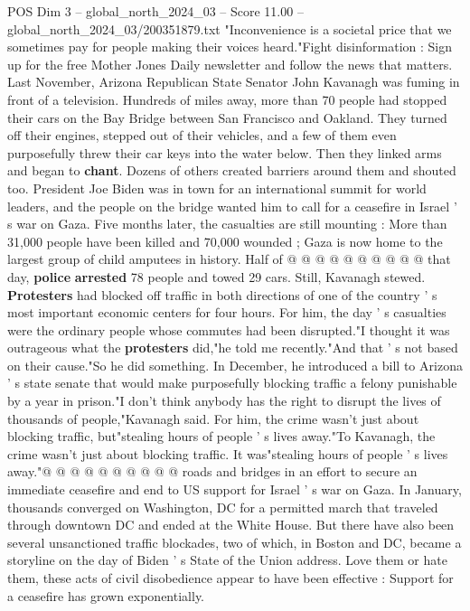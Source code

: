 \begin{textsample}{POS Dim 3 – global\_north\_2024\_03 – Score 11.00 – global\_north\_2024\_03/200351879.txt}  \label{ex:f3_pos_296}
"Inconvenience is a societal price that we sometimes pay for people making their voices heard."Fight disinformation : Sign up for the free Mother Jones Daily newsletter and follow the news that matters.
Last November, Arizona Republican State Senator John Kavanagh was fuming in front of a television.
Hundreds of miles away, more than 70 people had stopped their cars on the Bay Bridge between San Francisco and Oakland.
They turned off their engines, stepped out of their vehicles, and a few of them even purposefully threw their car keys into the water below.
Then they linked arms and began to \textbf{chant}.
Dozens of others created barriers around them and shouted too.
President Joe Biden was in town for an international summit for world leaders, and the people on the bridge wanted him to call for a ceasefire in Israel ' s war on Gaza.
Five months later, the casualties are still mounting : More than 31,000 people have been killed and 70,000 wounded ; Gaza is now home to the largest group of child amputees in history.
Half of @ @ @ @ @ @ @ @ @ @ that day, \textbf{police} \textbf{arrested} 78 people and towed 29 cars.
Still, Kavanagh stewed. \textbf{Protesters} had blocked off traffic in both directions of one of the country ' s most important economic centers for four hours.
For him, the day ' s casualties were the ordinary people whose commutes had been disrupted."I thought it was outrageous what the \textbf{protesters} did,"he told me recently."And that ' s not based on their cause."So he did something.
In December, he introduced a bill to Arizona ' s state senate that would make purposefully blocking traffic a felony punishable by a year in prison."I don't think anybody has the right to disrupt the lives of thousands of people,"Kavanagh said.
For him, the crime wasn't just about blocking traffic, but"stealing hours of people ' s lives away."To Kavanagh, the crime wasn't just about blocking traffic.
It was"stealing hours of people ' s lives away."@ @ @ @ @ @ @ @ @ @ roads and bridges in an effort to secure an immediate ceasefire and end to US support for Israel ' s war on Gaza.
In January, thousands converged on Washington, DC for a permitted march that traveled through downtown DC and ended at the White House.
But there have also been several unsanctioned traffic blockades, two of which, in Boston and DC, became a storyline on the day of Biden ' s State of the Union address.
Love them or hate them, these acts of civil disobedience appear to have been effective : Support for a ceasefire has grown exponentially.

\end{textsample}
